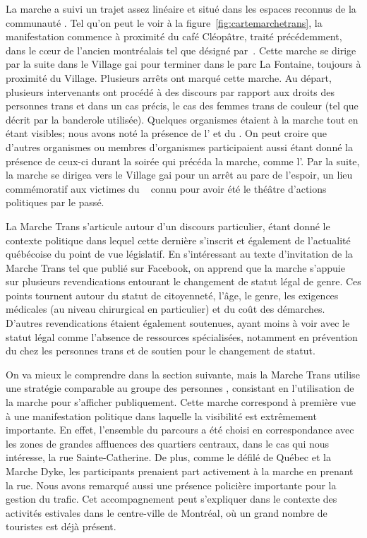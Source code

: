 La marche a suivi un trajet assez linéaire et situé dans les espaces reconnus de la communauté \lgbt{}.
Tel qu'on peut le voir à la figure~\ref{fig:cartemarchetrans}, la manifestation commence à proximité du café Cléopâtre, traité précédemment, dans le cœur de l'ancien  montréalais tel que désigné par~\citet{Chamberland1993}.
Cette marche se dirige par la suite dans le Village gai pour terminer dans le parc La Fontaine, toujours à proximité du Village.
Plusieurs arrêts ont marqué cette marche.
Au départ, plusieurs intervenants ont procédé à des discours par rapport aux droits des personnes trans et dans un cas précis, le cas des femmes trans de couleur (tel que décrit par la banderole utilisée).
Quelques organismes étaient à la marche tout en étant visibles; nous avons noté la présence de l'\atq{} et du \rlq{}.
On peut croire que d'autres organismes ou membres d'organismes participaient aussi étant donné la présence de ceux-ci durant la soirée qui précéda la marche, comme l'\astteq{}.
Par la suite, la marche se dirigea vers le Village gai pour un arrêt au parc de l'espoir, un lieu commémoratif aux victimes du \sida{}~\citep{Lafontaine2012} connu pour avoir été le théâtre d'actions politiques par le passé.

La Marche Trans s'articule autour d'un discours particulier, étant donné le contexte politique dans lequel cette dernière s'inscrit et également de l'actualité québécoise du point de vue législatif.
En s'intéressant au texte d'invitation de la Marche Trans tel que publié sur Facebook, on apprend que la marche s'appuie sur plusieurs revendications entourant le changement de statut légal de genre.
Ces points tournent autour du statut de citoyenneté, l'âge, le genre, les exigences médicales (au niveau chirurgical en particulier) et du coût des démarches.
D'autres revendications étaient également soutenues, ayant moins à voir avec le statut légal comme l'absence de ressources spécialisées, notamment en prévention du \vih{} chez les personnes trans et de soutien pour le changement de statut.

On va mieux le comprendre dans la section suivante, mais la Marche Trans utilise une stratégie comparable au groupe des personnes \dyke{}, consistant en l'utilisation de la marche pour s'afficher publiquement.
Cette marche correspond à première vue à une manifestation politique dans laquelle la visibilité est extrêmement importante.
En effet, l'ensemble du parcours a été choisi en correspondance avec les zones de grandes affluences des quartiers centraux, dans le cas qui nous intéresse, la rue Sainte-Catherine.
De plus, comme le défilé de Québec et la Marche Dyke, les participants prenaient part activement à la marche en prenant la rue.
Nous avons remarqué aussi une présence policière importante pour la gestion du trafic.
Cet accompagnement peut s'expliquer dans le contexte des activités estivales dans le centre-ville de Montréal, où un grand nombre de touristes est déjà présent.


